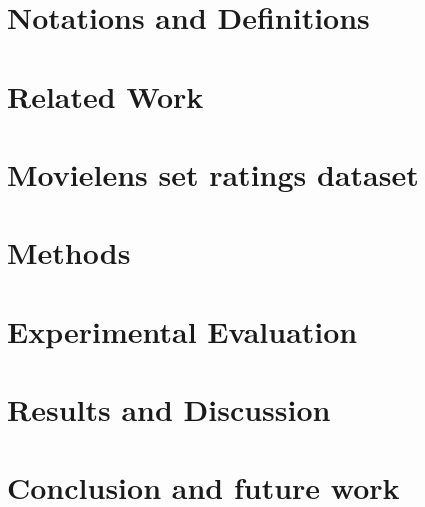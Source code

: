 \documentclass[format=acmsmall, review=false, screen=true]{acmart}
\begin{document}
\section{Notations and Definitions} \label{notation}


\section{Related Work} \label{related_work}


\section{Movielens set ratings dataset} \label{dataset}



\section{Methods} \label{lfs_method}


\section{Experimental Evaluation} \label{exp_eval}


\section{Results and Discussion} \label{results}


\section{Conclusion and future work} \label{conclusion}




\end{document}
